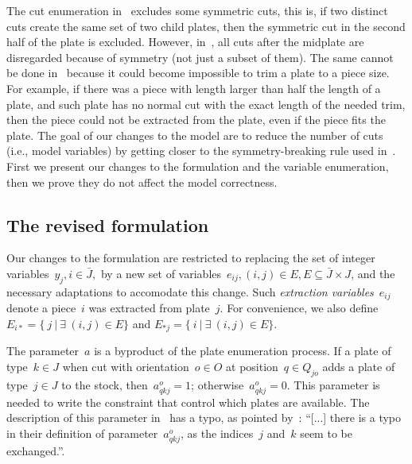 \documentclass[runningheads]{llncs}
\begin{document}

The cut enumeration in~\cite{furini:2016} excludes some symmetric cuts, this is, if two distinct cuts create the same set of two child plates, then the symmetric cut in the second half of the plate is excluded.
However, in~\cite{nicos:1977}, all cuts after the midplate are disregarded because of symmetry (not just a subset of them).
The same cannot be done in~\cite{furini:2016} because it could become impossible to trim a plate to a piece size.
For example, if there was a piece with length larger than half the length of a plate, and such plate has no normal cut with the exact length of the needed trim, then the piece could not be extracted from the plate, even if the piece fits the plate.
The goal of our changes to the model are to reduce the number of cuts (i.e., model variables) by getting closer to the symmetry-breaking rule used in~\cite{nicos:1977}.
First we present our changes to the formulation and the variable enumeration, then we prove they do not affect the model correctness.


\subsection{The revised formulation}

Our changes to the formulation are restricted to replacing the set of integer variables~\(y_j, i \in \bar{J},\) by a new set of variables~\(e_{ij}, (i, j) \in E, E \subseteq \bar{J} \times J\), and the necessary adaptations to accomodate this change.
Such \emph{extraction variables}~\(e_{ij}\) denote a piece~\(i\) was extracted from plate~\(j\).
For convenience, we also define \(E_{i*} = \{~j~|~\exists~(i, j) \in E \}\) and \(E_{*j} = \{~i~|~\exists~(i, j) \in E \}\).

The parameter~\(a\) is a byproduct of the plate enumeration process. If a plate of type~\(k \in J\) when cut with orientation~\(o \in O\) at position~\(q \in Q_{jo}\) adds a plate of type~\(j \in J\) to the stock, then~\(a^o_{qkj} = 1\); otherwise~\(a^o_{qkj} = 0\). This parameter is needed to write the constraint that control which plates are available. The description of this parameter in~\cite{furini:2016} has a typo, as pointed by~\cite{martin:2020}: ``[...] there is a typo in their definition of parameter~\(a^o_{qkj}\), as the indices~\(j\) and~\(k\) seem to be exchanged.''.
\end{document}
